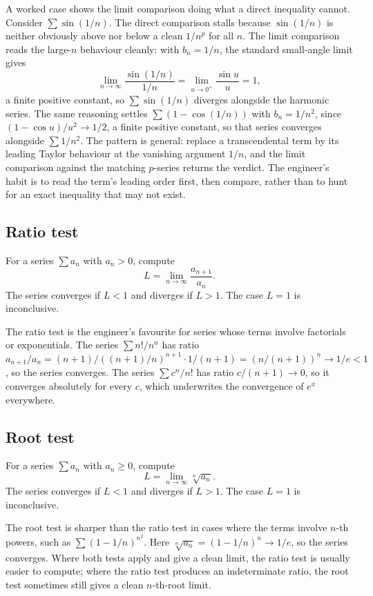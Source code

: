 A worked case shows the limit comparison doing what a direct inequality
cannot. Consider $\sum \sin(1/n)$. The direct comparison stalls because
$\sin(1/n)$ is neither obviously above nor below a clean $1/n^{p}$ for
all $n$. The limit comparison reads the large-$n$ behaviour cleanly:
with $b_{n} = 1/n$, the standard small-angle limit gives
\[
\lim_{n \to \infty} \frac{\sin(1/n)}{1/n} = \lim_{u \to 0^{+}}
\frac{\sin u}{u} = 1,
\]
a finite positive constant, so $\sum \sin(1/n)$ diverges alongside the
harmonic series. The same reasoning settles $\sum (1 - \cos(1/n))$ with
$b_{n} = 1/n^{2}$, since $(1 - \cos u)/u^{2} \to 1/2$, a finite positive
constant, so that series converges alongside $\sum 1/n^{2}$. The pattern
is general: replace a transcendental term by its leading Taylor behaviour
at the vanishing argument $1/n$, and the limit comparison against the
matching $p$-series returns the verdict. The engineer's habit is to read
the term's leading order first, then compare, rather than to hunt for an
exact inequality that may not exist.

\subsection{Ratio test}

For a series $\sum a_{n}$ with $a_{n} > 0$, compute
\[
L = \lim_{n \to \infty} \frac{a_{n+1}}{a_{n}}.
\]
The series converges if $L < 1$ and diverges if $L > 1$. The case
$L = 1$ is inconclusive.

The ratio test is the engineer's favourite for series whose terms
involve factorials or exponentials. The series $\sum n! / n^{n}$ has
ratio $a_{n+1}/a_{n} = (n+1)/((n+1)/n)^{n+1} \cdot 1/(n+1) = (n/(n+1))^{n}
\to 1/e < 1$, so the series converges. The series $\sum c^{n}/n!$ has
ratio $c/(n+1) \to 0$, so it converges absolutely for every $c$, which
underwrites the convergence of $e^{x}$ everywhere.

\subsection{Root test}

For a series $\sum a_{n}$ with $a_{n} \geq 0$, compute
\[
L = \lim_{n \to \infty} \sqrt[n]{a_{n}}.
\]
The series converges if $L < 1$ and diverges if $L > 1$. The case
$L = 1$ is inconclusive.

The root test is sharper than the ratio test in cases where the terms
involve $n$-th powers, such as $\sum (1 - 1/n)^{n^{2}}$. Here
$\sqrt[n]{a_{n}} = (1 - 1/n)^{n} \to 1/e$, so the series converges.
Where both tests apply and give a clean limit, the ratio test is
usually easier to compute; where the ratio test produces an
indeterminate ratio, the root test sometimes still gives a clean
$n$-th-root limit.


